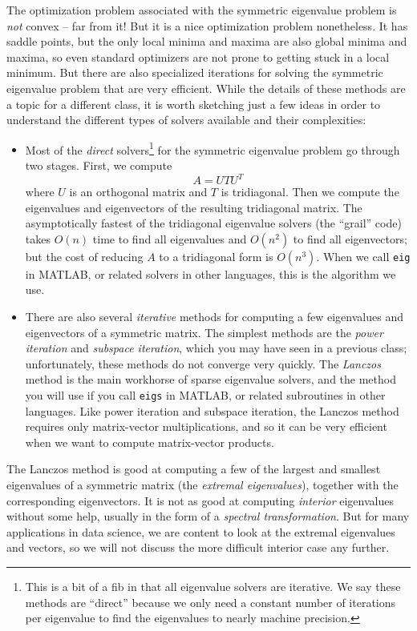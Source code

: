 \documentclass[12pt, leqno]{article} %
\begin{document}
The optimization problem associated with the symmetric eigenvalue
problem is {\em not} convex -- far from it!  But it is a nice
optimization problem nonetheless.  It has saddle points, but the only
local minima and maxima are also global minima and maxima, so even
standard optimizers are not prone to getting stuck in a local minimum.
But there are also specialized iterations for solving the symmetric
eigenvalue problem that are very efficient.  While the details of
these methods are a topic for a different class, it is worth sketching
just a few ideas in order to understand the different types of solvers
available and their complexities:
\begin{itemize}
\item
  Most of the {\em direct} solvers\footnote{%
    This is a bit of a fib in that all eigenvalue solvers are
    iterative.  We say these methods are ``direct'' because we
    only need a constant number of iterations per eigenvalue
    to find the eigenvalues to nearly machine precision.}
  for the symmetric eigenvalue problem go through two stages.  First,
  we compute
  \[
    A = U T U^T
  \]
  where $U$ is an orthogonal matrix and $T$ is tridiagonal.  Then we
  compute the eigenvalues and eigenvectors of the resulting
  tridiagonal matrix.  The asymptotically fastest of the tridiagonal
  eigenvalue solvers (the ``grail'' code) takes $O(n)$ time to find
  all eigenvalues and $O(n^2)$ to find all eigenvectors;
  but the cost of reducing $A$ to a tridiagonal form is
  $O(n^3)$.  When we call {\tt eig} in MATLAB, or related solvers in
  other languages, this is the algorithm we use.
\item
  There are also several {\em iterative} methods for computing a few
  eigenvalues and eigenvectors of a symmetric matrix.  The simplest
  methods are the {\em power iteration} and {\em subspace iteration},
  which you may have seen in a previous class; unfortunately, these
  methods do not converge very quickly.  The {\em Lanczos} method is
  the main workhorse of sparse eigenvalue solvers, and the method you
  will use if you call {\tt eigs} in MATLAB, or related subroutines in
  other languages.  Like power iteration and subspace iteration, the
  Lanczos method requires only matrix-vector multiplications, and so
  it can be very efficient when we want to compute matrix-vector
  products.
\end{itemize}
The Lanczos method is good at computing a few of the largest and
smallest eigenvalues of a symmetric matrix (the {\em extremal
  eigenvalues}), together with the corresponding eigenvectors.  It is
not as good at computing {\em interior} eigenvalues without some help,
usually in the form of a {\em spectral transformation}.  But for many
applications in data science, we are content to look at the extremal
eigenvalues and vectors, so we will not discuss the more difficult
interior case any further.
\end{document}
